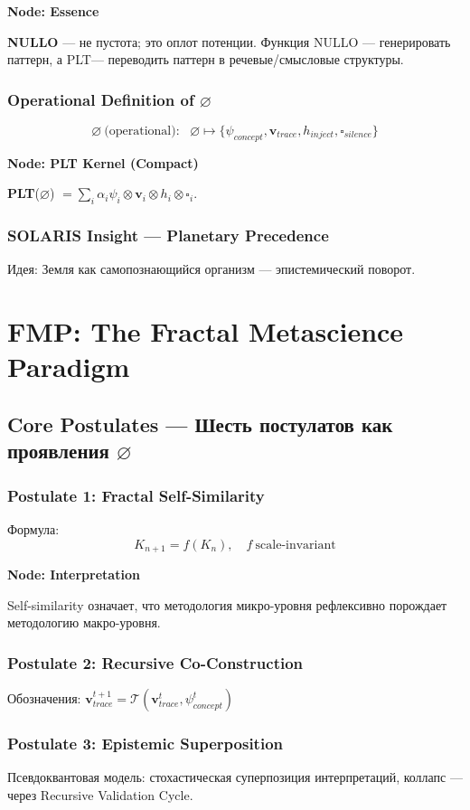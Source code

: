 \documentclass[11pt,oneside]{book}
\newenvironment{nodebox}[1]{%
  \vspace{6pt}
  \begin{framed}\noindent\textbf{Node: #1}\par\medskip\small\begingroup\setlength{\parindent}{0pt}\begin{minipage}{0.94\textwidth}\raggedright
}{%
  \end{minipage}\endgroup\end{framed}\vspace{6pt}
}
\newcommand{\NULLO}{\ensuremath{\varnothing}\xspace}
\newcommand{\PLT}{\textsc{PLT}\xspace}
\begin{document}
\begin{nodebox}{Essence}
\textbf{NULLO} — не пустота; это оплот потенции. Функция NULLO — генерировать паттерн, а \PLT — переводить паттерн в речевые/смысловые структуры.
\end{nodebox}

\section{Operational Definition of \NULLO}
\[
\NULLO \ \text{(operational)}:\ \ \ \varnothing \mapsto \{\psi_{concept}, \mathbf{v}_{trace}, h_{inject}, \square_{silence}\}
\]

\begin{nodebox}{PLT Kernel (Compact)}
\textbf{PLT}(\NULLO) $=\sum_i \alpha_i \psi_i \otimes \mathbf{v}_i \otimes h_i \otimes \square_i$.
\end{nodebox}

\section{SOLARIS Insight — Planetary Precedence}
Идея: Земля как самопознающийся организм — эпистемический поворот.

\part{FMP: The Fractal Metascience Paradigm}
\chapter{Core Postulates — Шесть постулатов как проявления \NULLO}
\section{Postulate 1: Fractal Self-Similarity}
Формула:
\[
K_{n+1} = f(K_n), \quad f \ \text{scale-invariant}
\]
\begin{nodebox}{Interpretation}
Self-similarity означает, что методология микро-уровня рефлексивно порождает методологию макро-уровня.
\end{nodebox}

\section{Postulate 2: Recursive Co-Construction}
Обозначения: $\mathbf{v}_{trace}^{t+1} = \mathcal{T}(\mathbf{v}_{trace}^t, \psi_{concept}^t)$

\section{Postulate 3: Epistemic Superposition}
Псевдоквантовая модель: стохастическая суперпозиция интерпретаций, коллапс — через Recursive Validation Cycle.
\end{document}
